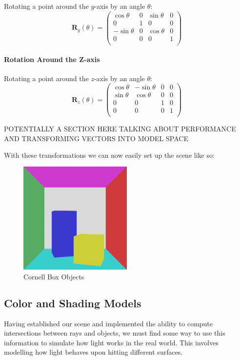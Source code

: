 \documentclass[12pt]{article}
\begin{document}
Rotating a point around the \(y\)-axis by an angle \(\theta\):
\[
    \mathbf{R}_y(\theta) = \begin{pmatrix}
        \cos \theta  & 0 & \sin \theta & 0 \\
        0            & 1 & 0           & 0 \\
        -\sin \theta & 0 & \cos \theta & 0 \\
        0            & 0 & 0           & 1 \\
    \end{pmatrix}
\]

\paragraph{Rotation Around the Z-axis}

Rotating a point around the \(z\)-axis by an angle \(\theta\):
\[
    \mathbf{R}_z(\theta) = \begin{pmatrix}
        \cos \theta & -\sin \theta & 0 & 0 \\
        \sin \theta & \cos \theta  & 0 & 0 \\
        0           & 0            & 1 & 0 \\
        0           & 0            & 0 & 1 \\
    \end{pmatrix}
\]

POTENTIALLY A SECTION HERE TALKING ABOUT PERFORMANCE AND TRANSFORMING VECTORS INTO MODEL SPACE

With these transformations we can now easily set up the scene like so:
\begin{figure}[H]
    \centering
    \includegraphics[width=0.5\textwidth]{images/no_lighting_cornell.png}
    \caption{Cornell Box Objects}
    \label{fig:unlitcornell}
\end{figure}


\subsection{Color and Shading Models}
Having established our scene and implemented the ability to compute intersections between rays and objects, we must find some way to use this information to simulate how light works in the real world. This involves modelling how light behaves upon hitting different surfaces.
\end{document}
